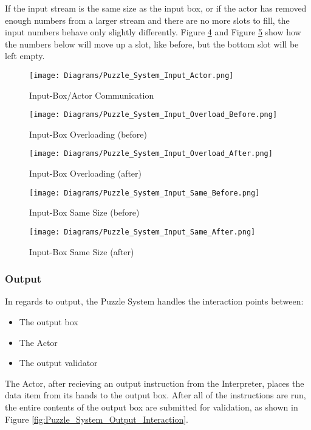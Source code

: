 If the input stream is the same size as the input box, or if the actor has removed
enough numbers from a larger stream and there are no more slots to fill, the input numbers
behave only slightly differently. Figure \ref{fig:Puzzle_System_Input_Same_Before}
and Figure \ref{fig:Puzzle_System_Input_Same_After} show how the numbers below will move up a slot, like before,
but the bottom slot will be left empty.\\

\begin{figure}[!hb]
  \caption{Input-Box/Actor Communication}
  \label{fig:Puzzle_System_Input_Actor}
  \centering
  \texttt{[image: Diagrams/Puzzle\_System\_Input\_Actor.png]}
\end{figure}

\begin{figure}[!hb]
  \caption{Input-Box Overloading (before)}
  \label{fig:Puzzle_System_Input_Overload_Before}
  \centering
  \texttt{[image: Diagrams/Puzzle\_System\_Input\_Overload\_Before.png]}
\end{figure}

\begin{figure}[!hb]
  \caption{Input-Box Overloading (after)}
  \label{fig:Puzzle_System_Input_Overload_After}
  \centering
  \texttt{[image: Diagrams/Puzzle\_System\_Input\_Overload\_After.png]}
\end{figure}
\vfill
\clearpage

\begin{figure}[!hb]
  \caption{Input-Box Same Size (before)}
  \label{fig:Puzzle_System_Input_Same_Before}
  \centering
  \texttt{[image: Diagrams/Puzzle\_System\_Input\_Same\_Before.png]}
\end{figure}

\begin{figure}[!hb]
  \caption{Input-Box Same Size (after)}
  \label{fig:Puzzle_System_Input_Same_After}
  \centering
  \texttt{[image: Diagrams/Puzzle\_System\_Input\_Same\_After.png]}
\end{figure}
\vfill
\clearpage

\subsubsection{Output}
In regards to output, the Puzzle System handles the interaction points between:
\begin{itemize}
  \item The output box
  \item The Actor
  \item The output validator
\end{itemize}
The Actor, after recieving an output instruction from the Interpreter, places the
data item from its hands to the output box. After all of the instructions are run, the
entire contents of the output box are submitted for validation, as shown in Figure
\ref{fig:Puzzle_System_Output_Interaction}.\\

